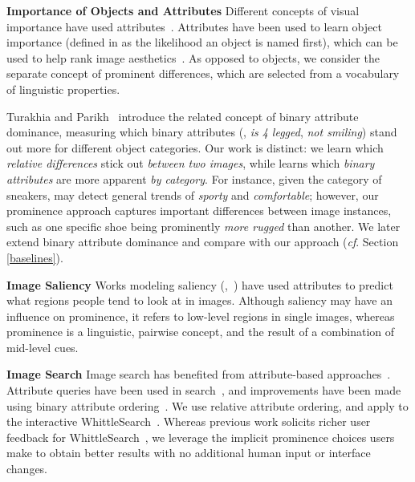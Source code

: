\documentclass[10pt,twocolumn,letterpaper]{article}
\begin{document}
\vspace{0.25cm}

\noindent \textbf{Importance of Objects and Attributes} \hspace{1em} Different concepts of visual importance have used attributes~\cite{importance, objectimportance, dominance, interestingness}.  Attributes have been used to learn object importance (defined in \cite{objectimportance} as the likelihood an object is named first), which can be used to help rank image aesthetics~\cite{interestingness, deepaesthetics}. As opposed to objects, we consider the separate concept of prominent differences, which are selected from a vocabulary of linguistic properties.

Turakhia and Parikh~\cite{dominance} introduce the related concept of binary attribute dominance, measuring which binary attributes (\eg, \textit{is 4 legged}, \textit{not smiling}) stand out more for different object categories. Our work is distinct: we learn which \textit{relative differences} stick out \textit{between two images}, while \cite{dominance} learns which \textit{binary attributes} are more apparent \textit{by category}. For instance, given the category of sneakers, \cite{dominance} may detect general trends of \textit{sporty} and \textit{comfortable}; however, our prominence approach captures important differences between image instances, such as one specific shoe being prominently \textit{more rugged} than another. We later extend binary attribute dominance and compare with our approach (\textit{cf}. Section \ref{baselines}).

\vspace{0.25cm}

\noindent \textbf{Image Saliency} \hspace{1em} Works modeling saliency (\eg,~\cite{wherehumanslook, deepsaliency, oldsaliency}) have used attributes to predict what regions people tend to look at in images. Although saliency may have an influence on prominence, it refers to low-level regions in single images, whereas prominence is a linguistic, pairwise concept, and the result of a combination of mid-level cues.

\vspace{0.25cm}

\noindent \textbf{Image Search} \hspace{1em} Image search has benefited from attribute-based approaches~\cite{imagerankingmulti, whittlesearch, dominance, jnd}.  Attribute queries have been used in search~\cite{imagerankingmulti}, and improvements have been made using binary attribute ordering~\cite{dominance}. We use relative attribute ordering, and apply to the interactive WhittleSearch~\cite{whittlesearch, whittlesearch2}. Whereas previous work solicits richer user feedback for WhittleSearch~\cite{jnd}, we leverage the implicit prominence choices users make to obtain better results with no additional human input or interface changes.
\end{document}
